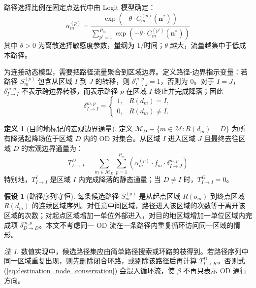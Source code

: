\documentclass[a4paper,12pt]{article}
\theoremstyle{plain}
\theoremstyle{definition}
\newtheorem{definition}[theorem]{定义}
\newtheorem{assumption}[theorem]{假设}
\theoremstyle{remark}
\newtheorem{remark}[theorem]{注}
\begin{document}
路径选择比例在固定点迭代中由 Logit 模型确定：
\begin{equation}
    \alpha_m^{(p)} = \frac{\exp(-\theta \cdot C_m^{(p)}(\bm n^*))}{\sum_{p'=1}^{P_m} \exp(-\theta \cdot C_m^{(p')}(\bm n^*))}
\end{equation}
其中 $\theta > 0$ 为离散选择敏感度参数，量纲为 $1/\text{时间}$；$\theta$ 越大，流量越集中于低成本路径。

为连接动态模型，需要把路径流量聚合到区域边界。定义路径-边界指示变量：若路径 $S_m^{(p)}$ 包含从区域 $I$ 到 $J$ 的转移，则 $\delta_{I \to J}^{m,p} = 1$，否则为 $0$。对于 $I=J$，$\delta_{I\to I}^{m,p}$ 不表示跨边界转移，而表示路径 $p$ 在区域 $I$ 终止并完成降落；因此
\begin{equation}
    \delta_{I\to I}^{m,p}=
    \begin{cases}
    1, & R(d_m)=I,\\
    0, & R(d_m)\ne I.
    \end{cases}
\end{equation}

\begin{definition}[目的地标记的宏观边界通量]\label{def:macro_flux}
定义 $\mathcal{M}_D \equiv \{m \in \mathcal{M}: R(d_m) = D\}$ 为所有降落起降场位于区域 $D$ 内的 OD 对集合。从区域 $I$ 进入区域 $J$ 且最终去往区域 $D$ 的宏观边界通量为：
\begin{equation} \label{eq:aggregation}
    T_{I \to J}^D = \sum_{m \in \mathcal{M}_D} \sum_{p=1}^{P_m} \left( \alpha_m^{(p)} \cdot f_m \cdot \delta_{I \to J}^{m,p} \right)
\end{equation}
特别地，$T_{I\to I}^I$ 是区域 $I$ 内完成降落的静态通量；当 $D\ne I$ 时，$T_{I\to I}^D=0$。
\end{definition}

\begin{assumption}[路径序列守恒]\label{asm:path_sequence_conservation}
每条候选路径 $S_m^{(p)}$ 是从起点区域 $R(o_m)$ 到终点区域 $R(d_m)$ 的连续区域序列。对任意中间区域，路径进入该区域的次数等于离开该区域的次数；对起点区域增加一单位外部进入，对目的地区域增加一单位区域内完成项 $\delta_{D\to D}^{m,p}$。本文不考虑同一 OD 流在一条路径内重复循环访问同一区域的情形。
\end{assumption}

\begin{remark}
数值实现中，候选路径集应由简单路径搜索或环路剪枝得到。若路径序列中同一区域重复出现，则先删除闭合环路，或剔除该路径后再计算 $T_{I\to K}^D$。否则式 (\ref{eq:destination_node_conservation}) 会混入循环流，使 $\beta$ 不再只表示 OD 通行方向。
\end{remark}
\end{document}
